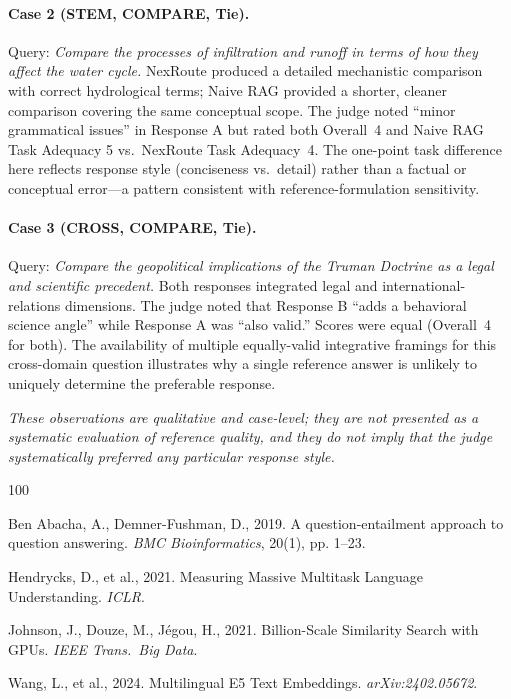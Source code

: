 \documentclass[a4paper,fleql,doubleblind]{cas-sc}
\begin{document}
\paragraph{Case 2 (STEM, COMPARE, Tie).}
Query: \textit{Compare the processes of infiltration and runoff in terms of
how they affect the water cycle.}
NexRoute produced a detailed mechanistic comparison with correct hydrological
terms; Naive RAG provided a shorter, cleaner comparison covering the same
conceptual scope.
The judge noted ``minor grammatical issues'' in Response A but rated both
Overall~4 and Naive RAG Task Adequacy 5 vs.\ NexRoute Task Adequacy~4.
The one-point task difference here reflects response style (conciseness vs.\
detail) rather than a factual or conceptual error---a pattern consistent with
reference-formulation sensitivity.

\paragraph{Case 3 (CROSS, COMPARE, Tie).}
Query: \textit{Compare the geopolitical implications of the Truman Doctrine as
a legal and scientific precedent.}
Both responses integrated legal and international-relations dimensions.
The judge noted that Response B ``adds a behavioral science angle'' while
Response A was ``also valid.''
Scores were equal (Overall~4 for both).
The availability of multiple equally-valid integrative framings for this
cross-domain question illustrates why a single reference answer is unlikely to
uniquely determine the preferable response.

\vspace{6pt}
\noindent\textit{These observations are qualitative and case-level; they are
not presented as a systematic evaluation of reference quality, and they do not
imply that the judge systematically preferred any particular response style.}

\begin{thebibliography}{100}

Ben Abacha, A., Demner-Fushman, D., 2019. A question-entailment approach to
question answering. \textit{BMC Bioinformatics}, 20(1), pp. 1--23.

Hendrycks, D., et al., 2021. Measuring Massive Multitask Language Understanding. \textit{ICLR}.

Johnson, J., Douze, M., J\'{e}gou, H., 2021. Billion-Scale Similarity Search with GPUs. \textit{IEEE Trans.\ Big Data}.

Wang, L., et al., 2024. Multilingual E5 Text Embeddings. \textit{arXiv:2402.05672}.

\end{thebibliography}
\end{document}
